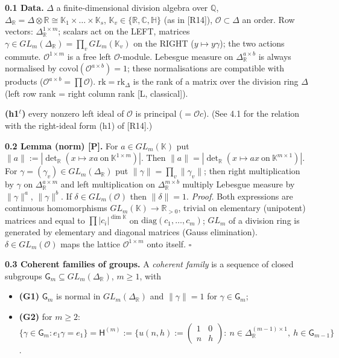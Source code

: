 \textbf{0.1 Data.} \(\Delta\) a finite-dimensional division algebra over \(\mathbb Q\), \(\Delta_{\mathbb R}=\Delta\otimes\mathbb R\cong\mathbb K_1\times\dots\times\mathbb K_s\), \(\mathbb K_v\in\{\mathbb R,\mathbb C,\mathbb H\}\) (as in {[}R14{]}), \(\mathcal O\subset\Delta\) an order. Row vectors: \(\Delta_{\mathbb R}^{1\times m}\); scalars act on the LEFT, matrices \(\gamma\in GL_m(\Delta_{\mathbb R})=\prod_vGL_m(\mathbb K_v)\) on the RIGHT (\(y\mapsto y\gamma\)); the two actions commute. \(\mathcal O^{1\times m}\) is a free left \(\mathcal O\)-module. Lebesgue measure on \(\Delta_{\mathbb R}^{a\times b}\) is always normalised by \(\mathrm{covol}(\mathcal O^{a\times b})=1\); these normalisations are compatible with products (\(\mathcal O^{a\times b}=\prod\mathcal O\)). \(\mathrm{rk}=\mathrm{rk}_\Delta\) is the rank of a matrix over the division ring \(\Delta\) (left row rank = right column rank {[}L, classical{]}).

\textbf{(h1\(^\ell\))} every nonzero left ideal of \(\mathcal O\) is principal (\(=\mathcal Oc\)). (See 4.1 for the relation with the right-ideal form (h1) of {[}R14{]}.)

\textbf{0.2 Lemma (norm) {[}P{]}.} For \(a\in GL_m(\mathbb K)\) put \(\|a\|:=|\det_{\mathbb R}(x\mapsto xa\ \text{on}\ \mathbb K^{1\times m})|\). Then \(\|a\|=|\det_{\mathbb R}(x\mapsto ax\ \text{on}\ \mathbb K^{m\times1})|\). For \(\gamma=(\gamma_v)\in GL_m(\Delta_{\mathbb R})\) put \(\|\gamma\|=\prod_v\|\gamma_v\|\); then right multiplication by \(\gamma\) on \(\Delta_{\mathbb R}^{a\times m}\) and left multiplication on \(\Delta_{\mathbb R}^{m\times b}\) multiply Lebesgue measure by \(\|\gamma\|^a\), \(\|\gamma\|^b\). If \(\delta\in GL_m(\mathcal O)\) then \(\|\delta\|=1\).
\emph{Proof.} Both expressions are continuous homomorphisms \(GL_m(\mathbb K)\to\mathbb R_{>0}\), trivial on elementary (unipotent) matrices and equal to \(\prod|c_i|^{\dim\mathbb K}\) on \(\mathrm{diag}(c_1,\dots,c_m)\); \(GL_m\) of a division ring is generated by elementary and diagonal matrices (Gauss elimination). \(\delta\in GL_m(\mathcal O)\) maps the lattice \(\mathcal O^{1\times m}\) onto itself. \(\square\)

\textbf{0.3 Coherent families of groups.} A \emph{coherent family} is a sequence of closed subgroups \(\mathsf G_m\subseteq GL_m(\Delta_{\mathbb R})\), \(m\ge1\), with

\begin{itemize}
\tightlist
\item
  \textbf{(G1)} \(\mathsf G_m\) is normal in \(GL_m(\Delta_{\mathbb R})\) and \(\|\gamma\|=1\) for \(\gamma\in\mathsf G_m\);
\item
  \textbf{(G2)} for \(m\ge2\): \(\{\gamma\in\mathsf G_m:e_1\gamma=e_1\}=\mathsf H^{(m)}:=\Big\{u(n,h):=\begin{pmatrix}1&0\\ n&h\end{pmatrix}:\ n\in\Delta_{\mathbb R}^{(m-1)\times1},\ h\in\mathsf G_{m-1}\Big\}\).
\end{itemize}

